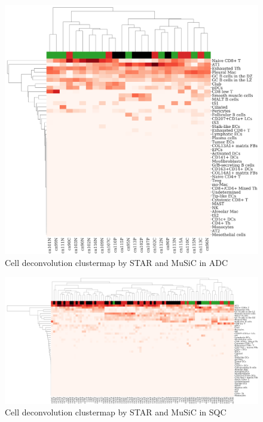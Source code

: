 \documentclass[11pt,a4paper,onecolumn,oneside]{report}
\begin{document}
                \begin{figure}[p]
                    \centering
                    \includegraphics[width=0.6 \linewidth]{figures/MuSiC/clustermap/STAR.ADC.cluster.pdf}
                    \caption{Cell deconvolution clustermap by STAR and MuSiC in ADC}
                    \label{fig:Deconvolution-MuSiC-STAR-cluster-ADC}
                \end{figure}

                \begin{figure}[p]
                    \centering
                    \includegraphics[width=\linewidth]{figures/MuSiC/clustermap/STAR.SQC.cluster.pdf}
                    \caption{Cell deconvolution clustermap by STAR and MuSiC in SQC}
                    \label{fig:Deconvolution-MuSiC-STAR-cluster-SQC}
                \end{figure}
\end{document}
